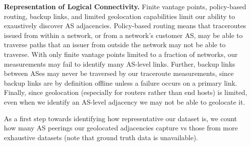 {    {\bf Representation of Logical Connectivity.} Finite vantage points,
    policy-based routing, backup links, and limited geolocation capabilities
    limit our ability to exaustively discover AS adjacencies.  Policy-based
    routing means that traceroutes issued from within a network, or from a
    network's customer AS, may be able to traverse paths that an issuer from
    outside the network may not be able to traverse.  With only finite vantage
    points limited to a fraction of networks, our measurements may fail to
    identify many AS-level links.  Further, backup links between ASes may never
    be traversed by our traceroute measurements, since backup links are by
    definition offline unless a failure occurs on a primary link.  Finally,
    since geolocation (especially for routers rather than end hosts) is
    limited, even when we identify an AS-level adjacency we may not be able to
    geolocate it.
    
    As a first step towards identifying how representative our dataset is, we
    count how many AS peerings our geolocated adjacencies capture vs those from
    more exhaustive datasets (note that ground truth data is unavailable).

}
